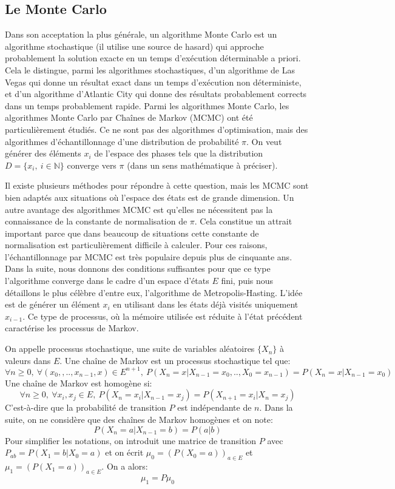 \subsection{Le Monte Carlo}
\label{sub:MC}
Dans son acceptation la plus générale, un algorithme Monte Carlo est un algorithme stochastique (il utilise une source de hasard) qui approche probablement la solution exacte en un temps d'exécution déterminable a priori. Cela le distingue, parmi les algorithmes stochastiques, d'un algorithme de Las Vegas qui donne un résultat exact dans un temps d'exécution non déterministe, et d'un algorithme d'Atlantic City qui donne des résultats probablement corrects dans un temps probablement rapide. Parmi les algorithmes Monte Carlo, les algorithmes Monte Carlo par Chaînes de Markov (MCMC) ont été particulièrement étudiés. Ce ne sont pas des algorithmes d'optimisation, mais des algorithmes d'échantillonnage d'une distribution de probabilité $\pi$. On veut générer des éléments $x_i$ de l'espace des phases tels que la distribution $D=\{x_i,\ i \in \mathbb{N} \}$ converge vers $\pi$ (dans un sens mathématique à préciser).

Il existe plusieurs méthodes pour répondre à cette question, mais les MCMC sont bien adaptés aux situations où l'espace des états est de grande dimension. Un autre avantage des algorithmes MCMC est qu'elles ne nécessitent pas la connaissance de la constante de normalisation de $\pi$. Cela constitue un attrait important parce que dans beaucoup de situations cette constante de normalisation est particulièrement difficile à calculer. Pour ces raisons, l'échantillonnage par MCMC est très populaire depuis plus de cinquante ans. Dans la suite, nous donnons des conditions suffisantes pour que ce type l'algorithme converge dans le cadre d'un espace d'états $E$ fini, puis nous détaillons le plus célèbre d'entre eux, l'algorithme de Metropolis-Hasting. L'idée est de générer un élément $x_i$ en utilisant dans les états déjà visités uniquement $x_{i-1}$. Ce type de processus, où la mémoire utilisée est réduite à l'état précédent caractérise les processus de Markov.


On appelle processus stochastique, une suite de variables aléatoires $\{X_n\}$ à valeurs dans $E$.
Une chaîne de Markov est un processus stochastique tel que:\\
\[ \forall n \geqslant 0 ,\ \forall (x_0,,..,x_{n-1},x) \in E^{n+1},\  P(X_n=x|X_{n-1}=x_0,..,X_{0}=x_{n-1}) = P(X_n=x|X_{n-1}=x_0) \]
Une chaîne de Markov est homogène si:
\begin{equation}
  \label{eq_homog}
\forall n \geqslant 0 ,\ \forall x_i,x_j \in E,\ P(X_n=x_i|X_{n-1}=x_j)= P(X_{n+1}=x_i|X_n=x_j) 
\end{equation}
C'est-à-dire que la probabilité de transition $P$ est indépendante de $n$. Dans la suite, on ne considère que des chaînes de Markov homogènes et on note:
\[P(X_n=a | X_{n-1}=b) = P(a|b)\]
Pour simplifier les notations, on introduit une matrice de transition $P$ avec $P_{ab}=P(X_1=b|X_0=a)$ et on écrit
$\mu_0 =(P(X_0=a))_{a \in E}$ et $\mu_1 =(P(X_1=a))_{a \in E}$. On a alors:
\[\mu_1 =P \mu_0\] 

